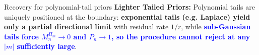 \documentclass[final]{beamer}
\newcommand{\Leb}{\mathrm{Leb}}
\newcommand{\Lap}{\mathrm{Lap}}
\newlength{\colwidth}
\begin{document}
\begin{frame}[t]
\begin{columns}[t]
\begin{column}{\colwidth}
\begin{alertblock}{Recovery for polynomial-tail priors}
    \textbf{Lighter Tailed Priors:} Polynomial tails are uniquely positioned at the boundary: \textcolor{DeepGreen}{\textbf{exponential tails (e.g. Laplace) yield only a partial directional limit}} with residual rate $1/r$, while \textcolor{blue}{\textbf{sub-Gaussian tails force $M_n^{\Pi_m} \to 0$ and $P_n \to 1$, so the procedure cannot reject at any $|m|$ sufficiently large}}. 
  \end{alertblock}










\end{column}
\end{columns}
\end{frame}
\end{document}

